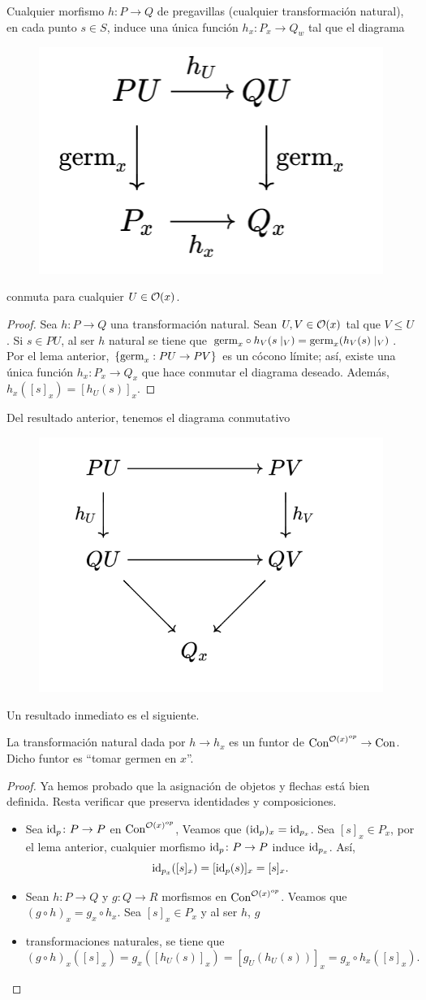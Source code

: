 \begin{lema}
    Cualquier morfismo $h:P\to Q$ de pregavillas (cualquier transformación natural), en cada punto $s\in S$, induce una única función $h_x:P_x\to Q_w$ tal que el diagrama 
    \begin{figure}[H]
        \centering
        \includegraphics[width=0.3\linewidth]{img/diagram2.3.3.png}
    \end{figure}
    conmuta para cualquier $U\in{\mathcal O}(x)$.
\end{lema}
\begin{proof}
    Sea $h:P\to Q$ una transformación natural. Sean $U,V\in{\mathcal O}(x)$ tal que $V\leq U$. Si $s\in PU$, al ser $h$ natural se tiene que ${\mathrm{germ}}_x\circ h_V(s\mid_V)={\mathrm{germ}}_x(h_V(s)\mid_V)$. Por el lema anterior, $\{{\mathrm{germ}}_x:PU\to PV\}$ es un cócono límite; así, existe una única función $h_x:P_x\to Q_x$ que hace conmutar el diagrama deseado. Además, $h_x([s]_x)=[h_U(s)]_x$. 
\end{proof}
\noindent
Del resultado anterior, tenemos el diagrama conmutativo
    \begin{figure}[H]
        \centering
        \includegraphics[width=0.37\linewidth]{img/diagram2.3.4.png}
    \end{figure}
\noindent
Un resultado inmediato es el siguiente.
\begin{lema}
    La transformación natural dada por $h\to h_x$ es un funtor de ${\mathrm{Con}}^{{\mathcal O}(x)^{op}}\to {\mathrm{Con}}$. Dicho funtor es ``tomar germen en $x$''.
\end{lema}

\begin{proof}
Ya hemos probado que la asignación de objetos y flechas está bien definida. Resta verificar que 
preserva identidades y composiciones.
\begin{itemize}
\item Sea ${\mathrm{id}}_p\colon P\to P$ en ${\mathrm{Con}}^{{\mathcal O}(x)^{op}}$, Veamos que $({\mathrm{id}}_p)_x={\mathrm{id}}_{p_x}$. Sea $[s]_x\in P_x$, por el lema anterior,
cualquier morfismo ${\mathrm{id}}_p\colon P\to P$ induce ${\mathrm{id}}_{p_x}$. Así,
\[
{\mathrm{id}}_{p_x}([s]_x)=[{\mathrm{id}}_p(s)]_x=[s]_x.
\]
\item Sean $h\colon P\to Q$ y $g\colon Q\to R$ morfismos en ${\mathrm{Con}}^{{\mathcal O}(x)^{op}}$. Veamos que $(g\circ h)_x=g_x\circ h_x$. Sea $[s]_x\in P_x$ y al ser $h$, $g$ 
\item transformaciones naturales, se tiene que
\[
(g\circ h)_x([s]_x)=g_x([h_U(s)]_x)=[g_U(h_U(s))]_x=g_x\circ h_x([s]_x).
\]
\end{itemize}
\end{proof}


